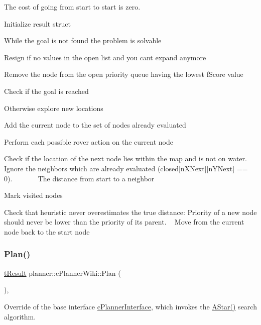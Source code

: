 The cost of going from start to start is zero.

Initialize result struct

While the goal is not found the problem is solvable

Resign if no values in the open list and you can\textquotesingle{}t expand anymore

Remove the node from the open priority queue having the lowest f\+Score value

Check if the goal is reached

Otherwise explore new locations

Add the current node to the set of nodes already evaluated

Perform each possible rover action on the current node

Check if the location of the next node lies within the map and is not on water. Ignore the neighbors which are already evaluated (closed\mbox{[}n\+X\+Next\mbox{]}\mbox{[}n\+Y\+Next\mbox{]} == 0). ~\newline
~\newline
~\newline
~\newline
 The distance from start to a neighbor

Mark visited nodes

Check that heuristic never overestimates the true distance\+: Priority of a new node should never be lower than the priority of its parent. ~\newline
 Move from the current node back to the start node \mbox{\label{classplanner_1_1c_planner_wiki_a9d18be721400b51162ff463ab11d1721}} 
\subsubsection{\texorpdfstring{Plan()}{Plan()}}
{\footnotesize\ttfamily \mbox{\hyperlink{structt_result}{t\+Result}} planner\+::c\+Planner\+Wiki\+::\+Plan (\begin{DoxyParamCaption}{ }\end{DoxyParamCaption})\hspace{0.3cm}{\ttfamily [override]}, {\ttfamily [virtual]}}



Override of the base interface \mbox{\hyperlink{classplanner_1_1c_planner_interface}{c\+Planner\+Interface}}, which invokes the \mbox{\hyperlink{classplanner_1_1c_planner_wiki_aa673ebc2b1b43af3b13fb0c958c5f2e4}{A\+Star()}} search algorithm. 


